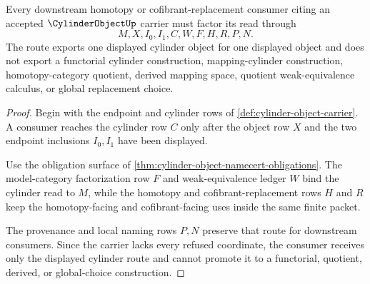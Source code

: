 \begin{theorem}
\label{thm:cylinder-object-factorization-route}
Every downstream homotopy or cofibrant-replacement consumer citing an accepted $\CylinderObjectUp$ carrier must factor its read through
$$
M,X,I_0,I_1,C,W,F,H,R,P,N .
$$
The route exports one displayed cylinder object for one displayed object and does not export a functorial cylinder construction, mapping-cylinder construction, homotopy-category quotient, derived mapping space, quotient weak-equivalence calculus, or global replacement choice.
\end{theorem}
\begin{proof}
Begin with the endpoint and cylinder rows of \autoref{def:cylinder-object-carrier}. A consumer reaches the cylinder row $C$ only after the object row $X$ and the two endpoint inclusions $I_0,I_1$ have been displayed.

Use the obligation surface of \autoref{thm:cylinder-object-namecert-obligations}. The model-category factorization row $F$ and weak-equivalence ledger $W$ bind the cylinder read to $M$, while the homotopy and cofibrant-replacement rows $H$ and $R$ keep the homotopy-facing and cofibrant-facing uses inside the same finite packet.

The provenance and local naming rows $P,N$ preserve that route for downstream consumers. Since the carrier lacks every refused coordinate, the consumer receives only the displayed cylinder route and cannot promote it to a functorial, quotient, derived, or global-choice construction.
\end{proof}


\begin{closurestatus}{\CylinderObjectUp}
  \theoryclosure{\seedClosure}
  \formalstatus{\formalTargetV}
\end{closurestatus}
